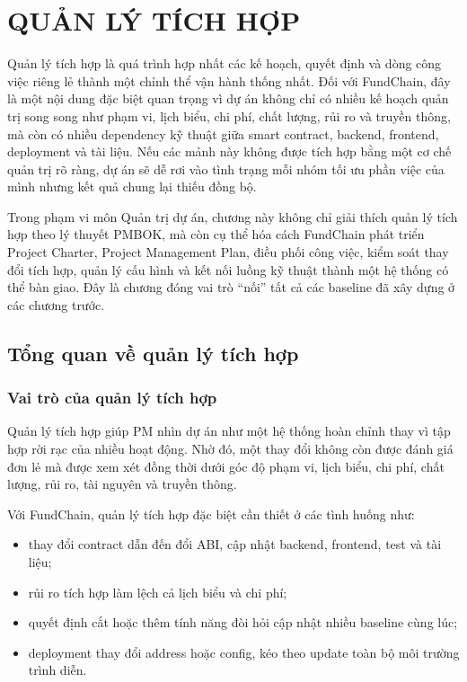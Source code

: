 \chapter{QUẢN LÝ TÍCH HỢP}

Quản lý tích hợp là quá trình hợp nhất các kế hoạch, quyết định và dòng công việc riêng lẻ thành một chỉnh thể vận hành thống nhất. Đối với FundChain, đây là một nội dung đặc biệt quan trọng vì dự án không chỉ có nhiều kế hoạch quản trị song song như phạm vi, lịch biểu, chi phí, chất lượng, rủi ro và truyền thông, mà còn có nhiều dependency kỹ thuật giữa smart contract, backend, frontend, deployment và tài liệu. Nếu các mảnh này không được tích hợp bằng một cơ chế quản trị rõ ràng, dự án sẽ dễ rơi vào tình trạng mỗi nhóm tối ưu phần việc của mình nhưng kết quả chung lại thiếu đồng bộ.

Trong phạm vi môn Quản trị dự án, chương này không chỉ giải thích quản lý tích hợp theo lý thuyết PMBOK, mà còn cụ thể hóa cách FundChain phát triển Project Charter, Project Management Plan, điều phối công việc, kiểm soát thay đổi tích hợp, quản lý cấu hình và kết nối luồng kỹ thuật thành một hệ thống có thể bàn giao. Đây là chương đóng vai trò ``nối'' tất cả các baseline đã xây dựng ở các chương trước.

\iffalse
\section{Tổng quan về quản lý tích hợp}

\subsection{Vai trò của quản lý tích hợp}

Quản lý tích hợp giúp PM nhìn dự án như một hệ thống hoàn chỉnh thay vì tập hợp rời rạc của nhiều hoạt động. Nhờ đó, một thay đổi không còn được đánh giá đơn lẻ mà được xem xét đồng thời dưới góc độ phạm vi, lịch biểu, chi phí, chất lượng, rủi ro, tài nguyên và truyền thông.

Với FundChain, quản lý tích hợp đặc biệt cần thiết ở các tình huống như:

\begin{itemize}
  \item thay đổi contract dẫn đến đổi ABI, cập nhật backend, frontend, test và tài liệu;
  \item rủi ro tích hợp làm lệch cả lịch biểu và chi phí;
  \item quyết định cắt hoặc thêm tính năng đòi hỏi cập nhật nhiều baseline cùng lúc;
  \item deployment thay đổi address hoặc config, kéo theo update toàn bộ môi trường trình diễn.
\end{itemize}


